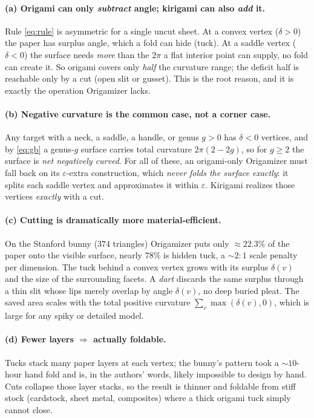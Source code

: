 \documentclass[11pt]{article}
\newcommand{\eps}{\varepsilon}
\newcommand{\defect}{\delta}
\begin{document}
\paragraph{(a) Origami can only \emph{subtract} angle; kirigami can also
\emph{add} it.} Rule \eqref{eq:rule} is asymmetric for a single uncut
sheet. At a convex vertex ($\defect>0$) the paper has surplus angle, which a
fold can hide (tuck). At a saddle vertex ($\defect<0$) the surface needs
\emph{more} than the $2\pi$ a flat interior point can supply, no fold can
create it. So origami covers only \emph{half} the curvature range; the
deficit half is reachable only by a cut (open slit or gusset). This is the
root reason, and it is exactly the operation Origamizer lacks.

\paragraph{(b) Negative curvature is the common case, not a corner case.}
Any target with a neck, a saddle, a handle, or genus $g>0$ has
$\defect<0$ vertices, and by \eqref{eq:gb} a genus-$g$ surface carries
total curvature $2\pi(2-2g)$, so for $g\ge 2$ the surface is \emph{net
negatively curved}. For all of these, an origami-only Origamizer must fall
back on its $\eps$-extra construction, which \emph{never folds the surface
exactly}: it splits each saddle vertex and approximates it within $\eps$.
Kirigami realizes those vertices \emph{exactly} with a cut.

\paragraph{(c) Cutting is dramatically more material-efficient.} On the
Stanford bunny ($374$ triangles) Origamizer puts only $\approx\!22.3\%$ of
the paper onto the visible surface, nearly $78\%$ is hidden tuck, a
$\sim\!2{:}1$ scale penalty per dimension. The tuck behind a convex vertex
grows with its surplus $\defect(v)$ and the size of the surrounding facets.
A \emph{dart} discards the same surplus through a thin slit whose lips
merely overlap by angle $\defect(v)$, no deep buried pleat. The saved
area scales with the total positive curvature $\sum_v\max(\defect(v),0)$,
which is large for any spiky or detailed model.

\paragraph{(d) Fewer layers $\Rightarrow$ actually foldable.} Tucks stack
many paper layers at each vertex; the bunny's pattern took a $\sim\!10$-hour
hand fold and is, in the authors' words, likely impossible to design by
hand. Cuts collapse those layer stacks, so the result is thinner and
foldable from stiff stock (cardstock, sheet metal, composites) where a
thick origami tuck simply cannot close.
\end{document}
